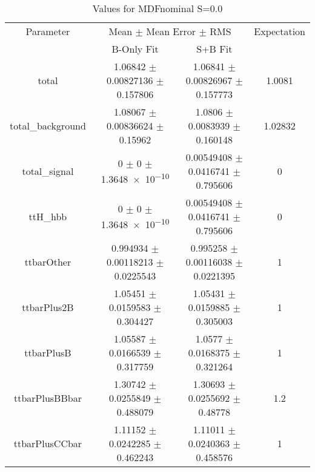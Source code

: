 \begin{table}
\centering
\caption{Values for MDFnominal S=0.0}
\begin{tabular}{cccc}
\toprule
Parameter & \multicolumn{2}{c}{Mean $\pm$ Mean Error $\pm$ RMS} & Expectation\\
 & B-Only Fit & S+B Fit & \\
\midrule
total & \num{1.06842} $\pm$ \num{0.00827136} $\pm$ \num{0.157806} & \num{1.06841} $\pm$ \num{0.00826967} $\pm$ \num{0.157773} & \num{1.0081}\\
total\_background & \num{1.08067} $\pm$ \num{0.00836624} $\pm$ \num{0.15962} & \num{1.0806} $\pm$ \num{0.0083939} $\pm$ \num{0.160148} & \num{1.02832}\\
total\_signal & \num{0} $\pm$ \num{0} $\pm$ \num{1.3648e-10} & \num{0.00549408} $\pm$ \num{0.0416741} $\pm$ \num{0.795606} & \num{0}\\
ttH\_hbb & \num{0} $\pm$ \num{0} $\pm$ \num{1.3648e-10} & \num{0.00549408} $\pm$ \num{0.0416741} $\pm$ \num{0.795606} & \num{0}\\
ttbarOther & \num{0.994934} $\pm$ \num{0.00118213} $\pm$ \num{0.0225543} & \num{0.995258} $\pm$ \num{0.00116038} $\pm$ \num{0.0221395} & \num{1}\\
ttbarPlus2B & \num{1.05451} $\pm$ \num{0.0159583} $\pm$ \num{0.304427} & \num{1.05431} $\pm$ \num{0.0159885} $\pm$ \num{0.305003} & \num{1}\\
ttbarPlusB & \num{1.05587} $\pm$ \num{0.0166539} $\pm$ \num{0.317759} & \num{1.0577} $\pm$ \num{0.0168375} $\pm$ \num{0.321264} & \num{1}\\
ttbarPlusBBbar & \num{1.30742} $\pm$ \num{0.0255849} $\pm$ \num{0.488079} & \num{1.30693} $\pm$ \num{0.0255692} $\pm$ \num{0.48778} & \num{1.2}\\
ttbarPlusCCbar & \num{1.11152} $\pm$ \num{0.0242285} $\pm$ \num{0.462243} & \num{1.11011} $\pm$ \num{0.0240363} $\pm$ \num{0.458576} & \num{1}\\
\bottomrule
\end{tabular}
\end{table}